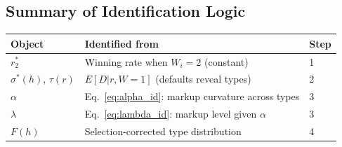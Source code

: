 \documentclass[12pt]{article}
\theoremstyle{plain}
\theoremstyle{plain}
\theoremstyle{definition}  %
\theoremstyle{remark}  %
\begin{document}
\subsection{Summary of Identification Logic}

\begin{center}
\renewcommand{\arraystretch}{1.4}
\begin{tabular}{lll}
\toprule
\textbf{Object} & \textbf{Identified from} & \textbf{Step} \\
\midrule
$r_2^*$ & Winning rate when $W_i = 2$ (constant) & 1 \\
$\sigma^*(h)$, $\tau(r)$ & $E[D|r, W=1]$ (defaults reveal types) & 2 \\
$\alpha$ & Eq.\ \eqref{eq:alpha_id}: markup curvature across types & 3 \\
$\lambda$ & Eq.\ \eqref{eq:lambda_id}: markup level given $\alpha$ & 3 \\
$F(h)$ & Selection-corrected type distribution & 4 \\
\bottomrule
\end{tabular}
\end{center}
\end{document}
